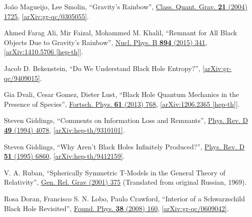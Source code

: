 \documentclass[preprintnumbers, floatfix, preprintnumbers, letterpaper, twocolumn, superscriptaddress,nofootinbib]{revtex4-2}
\begin{document}
\begin{thebibliography}{99}
Jo\~{a}o Magueijo, Lee Smolin, ``Gravity's Rainbow'', {\hypersetup{urlcolor=vividviolet}\href{https://iopscience.iop.org/article/10.1088/0264-9381/21/7/001}{Class. Quant. Grav. \textbf{21} (2004) 1725}}, \href{https://arxiv.org/abs/gr-qc/0305055}{[arXiv:gr-qc/0305055]}.

Ahmed Farag Ali, Mir Faizal, Mohammed M. Khalil, ``Remnant for All Black Objects Due to Gravity's Rainbow'', {\hypersetup{urlcolor=vividviolet}\href{https://www.sciencedirect.com/science/article/pii/S0550321315000966?via\%3Dihub}{Nucl. Phys. B \textbf{894} (2015) 341}}, \href{https://arxiv.org/abs/1410.5706}{[arXiv:1410.5706 [hep-th]]}.


Jacob D. Bekenstein, ``Do We Understand Black Hole Entropy?'', \href{https://arxiv.org/abs/gr-qc/9409015}{[arXiv:gr-qc/9409015]}.

Gia Dvali, Cesar Gomez, Dieter Lust, ``Black Hole Quantum Mechanics in the Presence of Species'', {\hypersetup{urlcolor=vividviolet}\href{https://onlinelibrary.wiley.com/doi/10.1002/prop.201300002}{Fortsch. Phys. \textbf{61} (2013) 768}}, \href{https://arxiv.org/abs/1206.2365}{[arXiv:1206.2365 [hep-th]]}.

Steven Giddings, ``Comments on Information Loss and Remnants'', {\hypersetup{urlcolor=vividviolet}\href{https://journals.aps.org/prd/abstract/10.1103/PhysRevD.49.4078}{Phys. Rev. D \textbf{49} (1994) 4078}}, \href{https://arxiv.org/abs/hep-th/9310101}{[arXiv:hep-th/9310101]}.

Steven Giddings, ``Why Aren't Black Holes Infinitely Produced?'', {\hypersetup{urlcolor=vividviolet}\href{https://journals.aps.org/prd/abstract/10.1103/PhysRevD.51.6860}{Phys. Rev. D \textbf{51} (1995) 6860}}, \href{https://arxiv.org/abs/hep-th/9412159}{[arXiv:hep-th/9412159]}.

V. A. Ruban, ``Spherically Symmetric T-Models in the General Theory of Relativity'', {\hypersetup{urlcolor=vividviolet}\href{https://link.springer.com/article/10.1023/A:1002779702615}{Gen. Rel. Grav  (2001) 375}} (Translated from original Russian, 1969).

Rosa Doran, Francisco S. N. Lobo, Paulo Crawford, ``Interior of a Schwarzschild Black Hole Revisited'', {\hypersetup{urlcolor=vividviolet}\href{https://link.springer.com/article/10.1007/s10701-007-9197-6}{Found. Phys. \textbf{38} (2008) 160}}, \href{https://arxiv.org/abs/gr-qc/0609042}{[arXiv:gr-qc/0609042]}.


\end{thebibliography}
\end{document}
